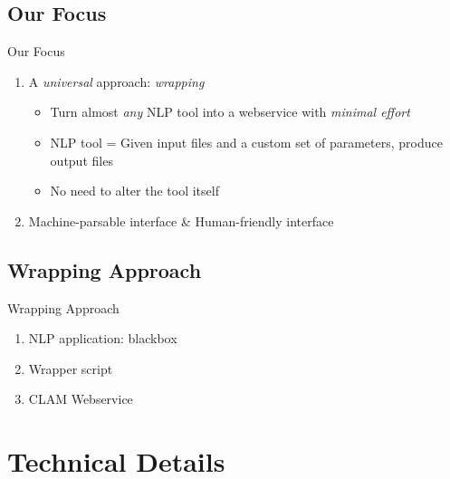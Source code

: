\documentclass[compress]{beamer}
\begin{document}
\subsection{Our Focus}
\begin{frame}
    \begin{block}{Our Focus}
   
        \begin{enumerate}
            \item A \emph{universal} approach: \emph{wrapping}
            \begin{itemize}
                \item Turn almost \emph{any} NLP tool into a webservice with \emph{minimal effort}
                \item NLP tool = Given input files and a custom set of parameters, produce output files
                \item No need to alter the tool itself
            \end{itemize}
            \item Machine-parsable interface \& Human-friendly interface
        \end{enumerate}
    
    \end{block}
\end{frame}


\subsection{Wrapping Approach}
\begin{frame}

    \begin{block}{Wrapping Approach}

       
        \begin{enumerate}
            \item NLP application: blackbox
            \item Wrapper script
            \item CLAM Webservice
        \end{enumerate}

    \end{block}


\end{frame}


\section{Technical Details}
\end{document}
